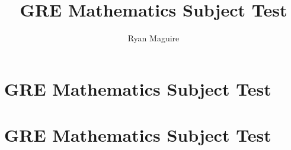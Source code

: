\documentclass[crop=false,class=book,oneside]{standalone}
\begin{document}
    \ifx\ifundergraduatemathematicswork\undefined
        \title{GRE Mathematics Subject Test}
        \author{Ryan Maguire}
        \date{\vspace{-5ex}}
        \maketitle
        \tableofcontents
        \clearpage
        \chapter*{GRE Mathematics Subject Test}
        \setcounter{chapter}{1}
    \else
        \chapter{GRE Mathematics Subject Test}
    \fi
\end{document}
